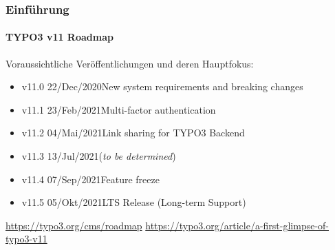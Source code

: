 %

\begin{frame}[fragile]
	\frametitle{Einführung}
	\framesubtitle{TYPO3 v11 Roadmap}

	Voraussichtliche Veröffentlichungen und deren Hauptfokus:

	\begin{itemize}
		\item
			\begingroup
				\color{typo3orange}
				v11.0 \tabto{1.1cm}22/Dec/2020\tabto{3.4cm}New system requirements and breaking changes
			\endgroup
		\item v11.1 \tabto{1.1cm}23/Feb/2021\tabto{3.4cm}Multi-factor authentication
		\item v11.2 \tabto{1.1cm}04/Mai/2021\tabto{3.4cm}Link sharing for TYPO3 Backend
		\item v11.3 \tabto{1.1cm}13/Jul/2021\tabto{3.4cm}(\textit{to be determined})
		\item v11.4 \tabto{1.1cm}07/Sep/2021\tabto{3.4cm}Feature freeze
		\item v11.5 \tabto{1.1cm}05/Okt/2021\tabto{3.4cm}LTS Release (Long-term Support)

	\end{itemize}

	\smaller
		\url{https://typo3.org/cms/roadmap}\newline
		\url{https://typo3.org/article/a-first-glimpse-of-typo3-v11}
	\normalsize

\end{frame}

